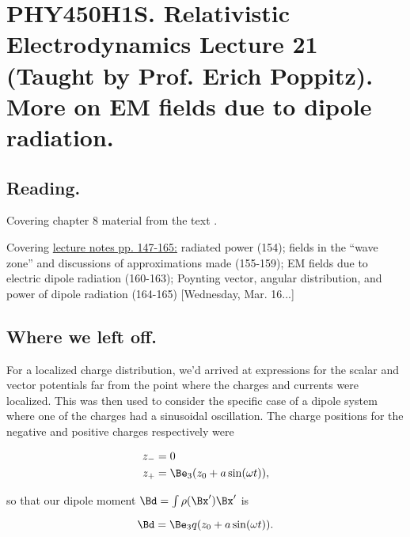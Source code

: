 
%
\usepackage{cancel}

\chapter{PHY450H1S.  Relativistic Electrodynamics Lecture 21 (Taught by Prof. Erich Poppitz).  More on EM fields due to dipole radiation.}
\label{chap:relativisticElectrodynamicsL21}
{}
\date{Mar 22, 2011}

\beginArtNoToc

\section{Reading.}

Covering chapter 8 material from the text \cite{landau1980classical}.

Covering \href{http://www.physics.utoronto.ca/~poppitz/epoppitz/PHY450_files/RelEMpp147-165.pdf}{lecture notes pp. 147-165:} radiated power (154); fields in the ``wave zone'' and discussions of approximations made (155-159); EM fields due to electric dipole radiation (160-163); Poynting vector, angular distribution, and power of dipole radiation (164-165) [Wednesday, Mar. 16...]

\section{Where we left off.}

For a localized charge distribution, we'd arrived at expressions for the scalar and vector potentials far from the point where the charges and currents were localized.  This was then used to consider the specific case of a dipole system where one of the charges had a sinusoidal oscillation.  The charge positions for the negative and positive charges respectively were

\begin{align}\label{eqn:relativisticElectrodynamicsL21:10}
z_{-} &= 0 \\
z_{+} &= \Be_3( z_0 + a \sin(\omega t)) ,
\end{align}

so that our dipole moment $\Bd = \int \rho(\Bx') \Bx'$ is

\begin{equation}\label{eqn:relativisticElectrodynamicsL21:30}
\Bd = \Be_3 q (z_0 + a \sin(\omega t)).
\end{equation}

